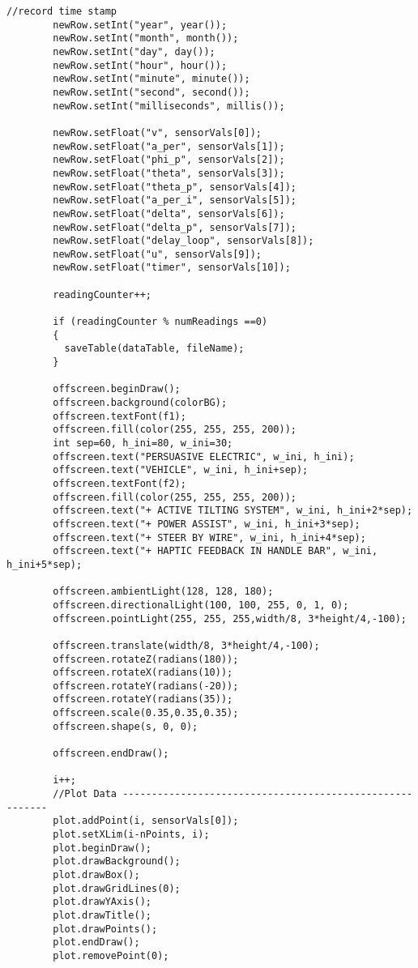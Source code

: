 \begin{lstlisting}[style=codejava]
        //record time stamp
        newRow.setInt("year", year());
        newRow.setInt("month", month());
        newRow.setInt("day", day());
        newRow.setInt("hour", hour());
        newRow.setInt("minute", minute());
        newRow.setInt("second", second());
        newRow.setInt("milliseconds", millis());

        newRow.setFloat("v", sensorVals[0]);
        newRow.setFloat("a_per", sensorVals[1]);
        newRow.setFloat("phi_p", sensorVals[2]);
        newRow.setFloat("theta", sensorVals[3]);
        newRow.setFloat("theta_p", sensorVals[4]);
        newRow.setFloat("a_per_i", sensorVals[5]);
        newRow.setFloat("delta", sensorVals[6]);
        newRow.setFloat("delta_p", sensorVals[7]);
        newRow.setFloat("delay_loop", sensorVals[8]);
        newRow.setFloat("u", sensorVals[9]);
        newRow.setFloat("timer", sensorVals[10]);

        readingCounter++; 

        if (readingCounter % numReadings ==0)
        {
          saveTable(dataTable, fileName);
        } 

        offscreen.beginDraw();
        offscreen.background(colorBG);
        offscreen.textFont(f1);       
        offscreen.fill(color(255, 255, 255, 200));
        int sep=60, h_ini=80, w_ini=30;
        offscreen.text("PERSUASIVE ELECTRIC", w_ini, h_ini);
        offscreen.text("VEHICLE", w_ini, h_ini+sep);
        offscreen.textFont(f2);
        offscreen.fill(color(255, 255, 255, 200));
        offscreen.text("+ ACTIVE TILTING SYSTEM", w_ini, h_ini+2*sep);
        offscreen.text("+ POWER ASSIST", w_ini, h_ini+3*sep);
        offscreen.text("+ STEER BY WIRE", w_ini, h_ini+4*sep);
        offscreen.text("+ HAPTIC FEEDBACK IN HANDLE BAR", w_ini, h_ini+5*sep);

        offscreen.ambientLight(128, 128, 180);
        offscreen.directionalLight(100, 100, 255, 0, 1, 0);
        offscreen.pointLight(255, 255, 255,width/8, 3*height/4,-100);

        offscreen.translate(width/8, 3*height/4,-100);
        offscreen.rotateZ(radians(180));
        offscreen.rotateX(radians(10));
        offscreen.rotateY(radians(-20));
        offscreen.rotateY(radians(35));
        offscreen.scale(0.35,0.35,0.35);
        offscreen.shape(s, 0, 0);

        offscreen.endDraw();
        
        i++;
        //Plot Data ---------------------------------------------------------
        plot.addPoint(i, sensorVals[0]);
        plot.setXLim(i-nPoints, i);
        plot.beginDraw();
        plot.drawBackground();
        plot.drawBox();
        plot.drawGridLines(0);
        plot.drawYAxis();
        plot.drawTitle();
        plot.drawPoints();
        plot.endDraw();
        plot.removePoint(0);
        

\end{lstlisting}
